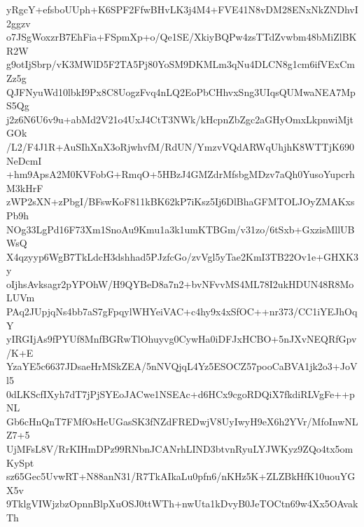 yRgcY+efsboUUph+K6SPF2FfwBHvLK3j4M4+FVE41N8vDM28ENxNkZNDhvI2ggzv
o7JSgWoxzrB7EhFia+FSpmXp+o/Qe1SE/XkiyBQPw4zsTTdZvwbm48bMiZlBKR2W
g9otIjSbrp/vK3MWlD5F2TA5Pj80YoSM9DKMLm3qNu4DLCN8g1cm6ifVExCmZz5g
QJFNyuWd10lbkI9Px8C8UogzFvq4nLQ2EoPbCHhvxSng3UIqsQUMwaNEA7MpS5Qg
j2z6N6U6v9u+abMd2V21o4UxJ4CtT3NWk/kHcpnZbZgc2aGHyOmxLkpnwiMjtGOk
/L2/F4J1R+AuSIhXnX3oRjwhvfM/RdUN/YmzvVQdARWqUhjhK8WTTjK690NeDcmI
+hm9ApsA2M0KVFobG+RmqO+5HBzJ4GMZdrMfsbgMDzv7aQh0YusoYupcrhM3kHrF
zWP2sXN+zPbgI/BFswKoF811kBK62kP7iKsz5Ij6DlBhaGFMTOLJOyZMAKxsPb9h
NOg33LgPd16F73Xm1SnoAu9Kmu1a3k1umKTBGm/v31zo/6tSxb+GxzisMllUBWsQ
X4qzyyp6WgB7TkLdcH3dshhad5PJzfcGo/zvVgl5yTae2KmI3TB22Ov1e+GHXK3y
oIjhsAvksagr2pYPOhW/H9QYBeD8a7n2+bvNFvvMS4ML78I2ukHDUN48R8MoLUVm
PAq2JUpjqNs4bb7aS7gFpqylWHYeiVAC+c4hy9x4xSfOC++nr373/CC1iYEJhOqY
yIRGIjAs9fPYUf8MnfBGRwTlOhuyvg0CywHa0iDFJxHCBO+5nJXvNEQRfGpv/K+E
YzaYE5c6637JDsaeHrMSkZEA/5nNVQjqL4Yz5ESOCZ57pooCaBVA1jk2o3+JoVl5
0dLKScfIXyh7dT7jPjSYEoJACwe1NSEAc+d6HCx9cgoRDQiX7fkdiRLVgFe++pNL
Gb6cHnQnT7FMfOsHeUGasSK3fNZdFREDwjV8UyIwyH9eX6h2YVr/MfoInwNLZ7+5
UjMFsL8V/RrKIHmDPz99RNbnJCANrhLIND3btvnRyuLYJWKyz9ZQo4tx5omKySpt
sz65Gec5UvwRT+N88anN31/R7TkAIkaLu0pfn6/nKHz5K+ZLZBkHfK10uouYGX5v
9TklgVIWjzbzOpnnBlpXuOSJ0ttWTh+nwUta1kDvyB0JeTOCtn69w4Xx5OAvakTh
